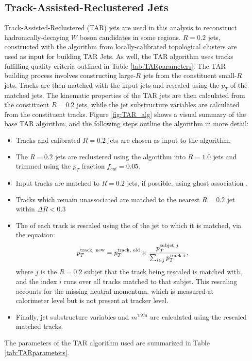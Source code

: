 \subsection{Track-Assisted-Reclustered Jets}
\label{subsection:TARjets}
Track-Assisted-Reclustered (TAR) jets \cite{TAR} are used in this analysis to reconstruct hadronically-decaying $W$ boson candidates in some regions. $R=0.2$ jets, constructed with the \akt algorithm \cite{antikt} from locally-calibrated topological clusters \cite{TopoClusters} are used as input for building TAR Jets. As well, the TAR algorithm uses tracks fulfilling quality criteria outlined in Table \ref{tab:TARparameters}. The TAR building process involves constructing large-$R$ jets from the constituent small-$R$ jets. Tracks are then matched with the input jets and rescaled using the $p_T$ of the matched jets. The kinematic properties of the TAR jets are then calculated from the constituent $R=0.2$ jets, while the jet substructure variables are calculated from the constituent tracks. Figure \ref{fig:TAR_alg} shows a visual summary of the base TAR algorithm, and
the following steps outline the algorithm in more detail:
\begin{itemize}
  \item Tracks and calibrated \akt $R=0.2$ jets are chosen as input to the algorithm.
  \item The \akt $R=0.2$ jets are reclustered using the \akt algorithm into $R=1.0$ jets and trimmed using the $p_T$ fraction \(f_{cut}=0.05\).
  \item Input tracks are matched to $R=0.2$ jets, if possible, using ghost association \cite{Ghost}.
  \item Tracks which remain unassociated are matched to the nearest \akt $R=0.2$ jet within $\Delta R<0.3$
  \item The \pT of each track is rescaled using the \pT of the jet to which it is matched, via the equation:
  \begin{equation}
  p_T^{\text{track, new}} = p_T^{\text{track, old}}\times \frac{p_T^{\text{subjet $j$}}}{\sum_{i \in j} p_T^{\text{track $i$}}} ,
  \label{eq:TAR_rescale}
  \end{equation}  where $j$ is the $R=0.2$ subjet that the track being rescaled is matched with, and the index $i$ runs over all tracks matched to that subjet. This rescaling accounts for the missing neutral momentum, which is measured at calorimeter level but is not present at tracker level.
  \item Finally, jet substructure variables and $m^\text{TAR}$ are calculated using the rescaled matched tracks.
\end{itemize}
The parameters of the TAR algorithm used are summarized in Table \ref{tab:TARparameters}. \\

